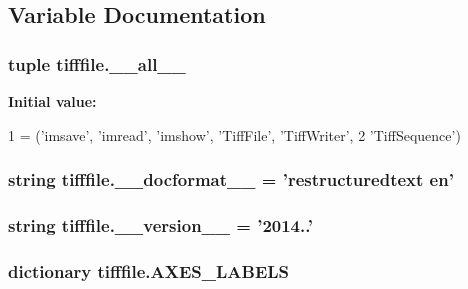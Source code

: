 \subsection{Variable Documentation}
\hypertarget{namespacetifffile_a12bf597c6d149817843e1a251fea24ac}{
\subsubsection[{\-\_\-\-\_\-all\-\_\-\-\_\-}]{\setlength{\rightskip}{0pt plus 5cm}tuple tifffile.\-\_\-\-\_\-all\-\_\-\-\_\-}}\label{namespacetifffile_a12bf597c6d149817843e1a251fea24ac}
{\bfseries Initial value\-:}
\begin{DoxyCode}
1 = (\textcolor{stringliteral}{'imsave'}, \textcolor{stringliteral}{'imread'}, \textcolor{stringliteral}{'imshow'}, \textcolor{stringliteral}{'TiffFile'}, \textcolor{stringliteral}{'TiffWriter'},
2            \textcolor{stringliteral}{'TiffSequence'})
\end{DoxyCode}
\hypertarget{namespacetifffile_a900bf07922924124a5d8136cf1da827b}{
\subsubsection[{\-\_\-\-\_\-docformat\-\_\-\-\_\-}]{\setlength{\rightskip}{0pt plus 5cm}string tifffile.\-\_\-\-\_\-docformat\-\_\-\-\_\- = 'restructuredtext en'}}\label{namespacetifffile_a900bf07922924124a5d8136cf1da827b}
\hypertarget{namespacetifffile_ade9492864cbf7aa8ab8df8ccfadcb517}{
\subsubsection[{\-\_\-\-\_\-version\-\_\-\-\_\-}]{\setlength{\rightskip}{0pt plus 5cm}string tifffile.\-\_\-\-\_\-version\-\_\-\-\_\- = '2014..'}}\label{namespacetifffile_ade9492864cbf7aa8ab8df8ccfadcb517}
\hypertarget{namespacetifffile_af7b2944b3002574b5f1af6c83772dc87}{
\subsubsection[{A\-X\-E\-S\-\_\-\-L\-A\-B\-E\-L\-S}]{\setlength{\rightskip}{0pt plus 5cm}dictionary tifffile.\-A\-X\-E\-S\-\_\-\-L\-A\-B\-E\-L\-S}}\label{namespacetifffile_af7b2944b3002574b5f1af6c83772dc87}
